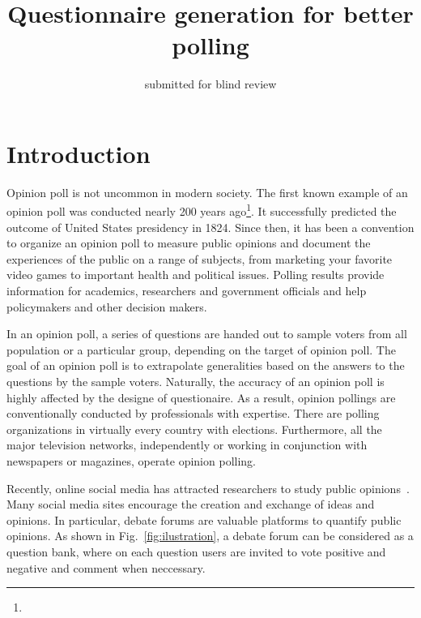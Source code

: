 \documentclass{llncs}
\begin{document}
\title{Questionnaire generation for better polling}
\author{submitted for blind review}
\maketitle




\begin{abstract}




\end{abstract}




\section{Introduction}


Opinion poll is not uncommon in modern society. The first known example of an opinion poll was conducted nearly 200 years ago\footnote{}. It successfully predicted the outcome of United States presidency in 1824. Since then, it has been a convention to organize an opinion poll to measure public opinions and document the experiences of the public on a range of subjects, from marketing your favorite video games to important health and political issues. Polling results provide information for academics, researchers and government officials and help policymakers and other decision makers.


In an opinion poll, a series of questions are handed out to sample voters from all population or a particular group, depending on the target of opinion poll. The goal of an opinion poll is to extrapolate generalities based on the answers to the questions by the sample voters. Naturally, the accuracy of an opinion poll is highly affected by the designe of questionaire. As a result, opinion pollings are conventionally conducted by professionals with expertise. There are polling organizations in virtually every country with elections. Furthermore, all the major television networks, independently or working in conjunction with newspapers or magazines, operate opinion polling.


Recently, online social media has attracted researchers to study public opinions~\cite{}. Many social media sites encourage the creation and exchange of ideas and opinions. In particular, debate forums are valuable platforms to quantify public opinions. As shown in Fig.~\ref{fig:ilustration}, a debate forum can be considered as a question bank, where on each question users are invited to vote positive and negative and comment when neccessary.
\end{document}
